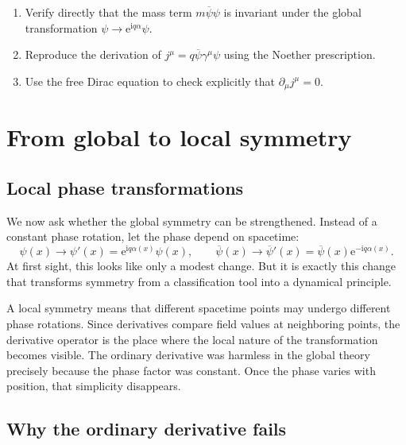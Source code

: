 \documentclass[11pt,a4paper]{article}
\newcommand{\ii}{\mathrm{i}}
\newcommand{\ee}{\mathrm{e}}
\newcommand{\p}{\partial}
\newcommand{\psibar}{\overline{\psi}}
\begin{document}
\begin{guidedchecksbox}
\vspace{0.25cm}
\begin{enumerate}[leftmargin=1.6em,label=\arabic*.]
    \item Verify directly that the mass term \(m\psibar\psi\) is invariant under the global transformation \(\psi\to \ee^{\ii q\alpha}\psi\).
    \item Reproduce the derivation of \(j^\mu=q\psibar\gamma^\mu\psi\) using the Noether prescription.
    \item Use the free Dirac equation to check explicitly that \(\p_\mu j^\mu=0\).
\end{enumerate}
\end{guidedchecksbox}



\section{From global to local symmetry}

\subsection{Local phase transformations}

We now ask whether the global symmetry can be strengthened. Instead of a constant phase rotation, let the phase depend on spacetime:
\begin{equation}
\psi(x)\longrightarrow \psi'(x)=\ee^{\ii q\alpha(x)}\psi(x),
\qquad
\psibar(x)\longrightarrow \psibar'(x)=\psibar(x)\ee^{-\ii q\alpha(x)}.
\label{eq:local-u1-expanded-full}
\end{equation}
At first sight, this looks like only a modest change. But it is exactly this change that transforms symmetry from a classification tool into a dynamical principle.

A local symmetry means that different spacetime points may undergo different phase rotations. Since derivatives compare field values at neighboring points, the derivative operator is the place where the local nature of the transformation becomes visible. The ordinary derivative was harmless in the global theory precisely because the phase factor was constant. Once the phase varies with position, that simplicity disappears.

\subsection{Why the ordinary derivative fails}
\end{document}
